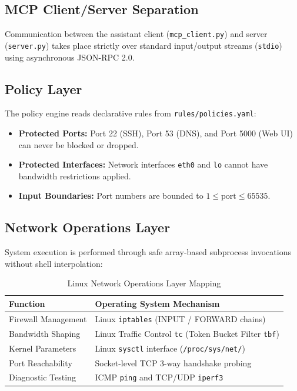 \documentclass[11pt,a4paper]{article}
\begin{document}
\subsection{MCP Client/Server Separation}
Communication between the assistant client (\texttt{mcp_client.py}) and server (\texttt{server.py}) takes place strictly over standard input/output streams (\texttt{stdio}) using asynchronous JSON-RPC 2.0.

\subsection{Policy Layer}
The policy engine reads declarative rules from \texttt{rules/policies.yaml}:
\begin{itemize}
    \item \textbf{Protected Ports:} Port 22 (SSH), Port 53 (DNS), and Port 5000 (Web UI) can never be blocked or dropped.
    \item \textbf{Protected Interfaces:} Network interfaces \texttt{eth0} and \texttt{lo} cannot have bandwidth restrictions applied.
    \item \textbf{Input Boundaries:} Port numbers are bounded to $1 \le \text{port} \le 65535$.
\end{itemize}

\subsection{Network Operations Layer}
System execution is performed through safe array-based subprocess invocations without shell interpolation:

\begin{table}[h]
\centering
\small
\begin{tabularx}{\textwidth}{lX}
\toprule
\textbf{Function} & \textbf{Operating System Mechanism} \\
\midrule
Firewall Management & Linux \texttt{iptables} (INPUT / FORWARD chains) \\
Bandwidth Shaping & Linux Traffic Control \texttt{tc} (Token Bucket Filter \texttt{tbf}) \\
Kernel Parameters & Linux \texttt{sysctl} interface (\texttt{/proc/sys/net/}) \\
Port Reachability & Socket-level TCP 3-way handshake probing \\
Diagnostic Testing & ICMP \texttt{ping} and TCP/UDP \texttt{iperf3} \\
\bottomrule
\end{tabularx}
\caption{Linux Network Operations Layer Mapping}
\end{table}
\end{document}
